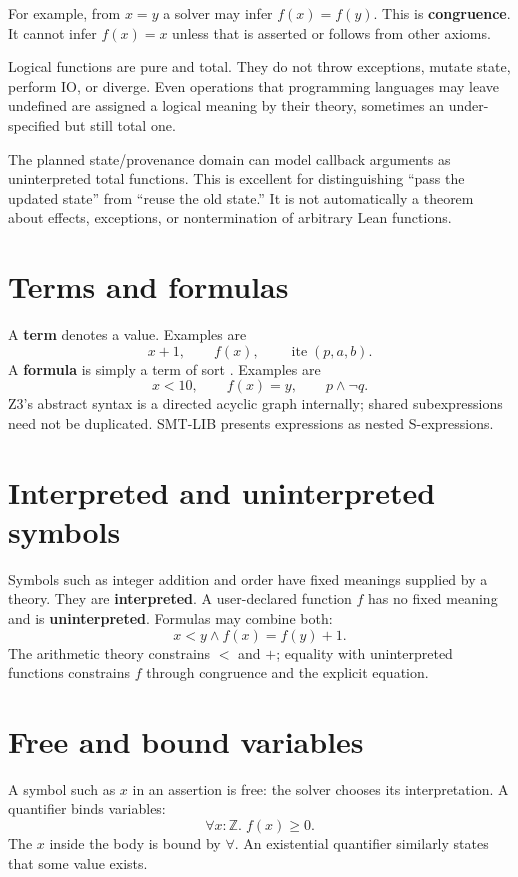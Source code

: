 \documentclass[10pt,letterpaper,oneside]{report}
\newcommand{\code}[1]{\texttt{\detokenize{#1}}}
\newcommand{\Int}{\mathbb{Z}}
\newcommand{\term}[1]{\textbf{#1}}
\begin{document}
For example, from $x=y$ a solver may infer $f(x)=f(y)$. This is \term{congruence}. It cannot infer $f(x)=x$ unless that is asserted or follows from other axioms.

Logical functions are pure and total. They do not throw exceptions, mutate state, perform IO, or diverge. Even operations that programming languages may leave undefined are assigned a logical meaning by their theory, sometimes an under-specified but still total one.

\begin{projectnote}
The planned state/provenance domain can model callback arguments as uninterpreted total functions. This is excellent for distinguishing ``pass the updated state'' from ``reuse the old state.'' It is not automatically a theorem about effects, exceptions, or nontermination of arbitrary Lean functions.
\end{projectnote}

\section{Terms and formulas}

A \term{term} denotes a value. Examples are
\[
  x+1,\qquad f(x),\qquad \operatorname{ite}(p,a,b).
\]
A \term{formula} is simply a term of sort \code{Bool}. Examples are
\[
  x<10,\qquad f(x)=y,\qquad p\land\neg q.
\]
Z3's abstract syntax is a directed acyclic graph internally; shared subexpressions need not be duplicated. SMT-LIB presents expressions as nested S-expressions.

\section{Interpreted and uninterpreted symbols}

Symbols such as integer addition and order have fixed meanings supplied by a theory. They are \term{interpreted}. A user-declared function $f$ has no fixed meaning and is \term{uninterpreted}. Formulas may combine both:
\[
  x<y\land f(x)=f(y)+1.
\]
The arithmetic theory constrains $<$ and $+$; equality with uninterpreted functions constrains $f$ through congruence and the explicit equation.

\section{Free and bound variables}

A symbol such as $x$ in an assertion is free: the solver chooses its interpretation. A quantifier binds variables:
\[
  \forall x:\Int.\; f(x)\ge 0.
\]
The $x$ inside the body is bound by $\forall$. An existential quantifier similarly states that some value exists.
\end{document}
